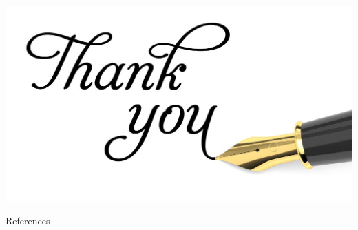 \documentclass{beamer}
\begin{document}
\begin{frame}
	\centering
	\includegraphics[width=1.4\linewidth]{images/thank-you.jpg}
\end{frame}

\appendix 

\begin{frame}{References}
  \printbibliography  
\end{frame}  
\end{document}
